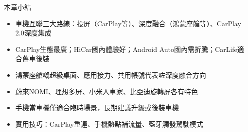 \begin{tcbsummary}{本章小結}
\begin{itemize}
  \item 車機互聯三大路線：投屏（CarPlay等）、深度融合（鴻蒙座艙等）、CarPlay 2.0深度集成
  \item CarPlay生態最廣；HiCar國內體驗好；Android Auto國內需折騰；CarLife適合舊車後裝
  \item 鴻蒙座艙嘅超級桌面、應用接力、共用帳號代表咗深度融合方向
  \item 蔚來NOMI、理想多屏、小米人車家、比亞迪旋轉屏各有特色
  \item 手機當車機僅適合臨時場景，長期建議升級或後裝車機
  \item 實用技巧：CarPlay重連、手機熱點補流量、藍牙觸發駕駛模式
\end{itemize}

\end{tcbsummary}

